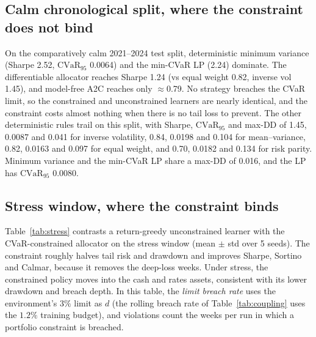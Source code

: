 \documentclass[sigconf]{acmart}
\begin{document}
\subsection{Calm chronological split, where the constraint does not bind}
On the comparatively calm 2021--2024 test split, deterministic minimum variance
(Sharpe 2.52, $\mathrm{CVaR}_{95}$ 0.0064) and the min-CVaR LP (2.24) dominate. The
differentiable allocator reaches Sharpe 1.24 (vs equal weight 0.82, inverse vol
1.45), and model-free A2C reaches only $\approx$0.79. No strategy breaches the CVaR limit, so
the constrained and unconstrained learners are nearly identical, and the constraint costs almost
nothing when there is no tail loss to prevent. The other deterministic rules trail on this
split, with Sharpe, $\mathrm{CVaR}_{95}$ and max-DD of 1.45, 0.0087 and 0.041 for inverse
volatility, 0.84, 0.0198 and 0.104 for mean--variance, 0.82, 0.0163 and 0.097 for equal weight,
and 0.70, 0.0182 and 0.134 for risk parity. Minimum variance and the min-CVaR LP share a max-DD
of 0.016, and the LP has $\mathrm{CVaR}_{95}$ 0.0080.

\subsection{Stress window, where the constraint binds}
Table~\ref{tab:stress} contrasts a return-greedy unconstrained learner with the
CVaR-constrained allocator on the stress window (mean $\pm$ std over 5 seeds). The
constraint roughly halves tail risk and drawdown and improves Sharpe, Sortino and
Calmar, because it removes the deep-loss weeks. Under stress, the constrained policy moves into
the cash and rates assets, consistent with its lower drawdown and breach depth. In this table,
the \emph{limit breach rate} uses the environment's $3\%$ limit as $d$ (the rolling breach rate of
Table~\ref{tab:coupling} uses the $1.2\%$ training budget), and violations count the weeks per
run in which a portfolio constraint is breached.
\end{document}
